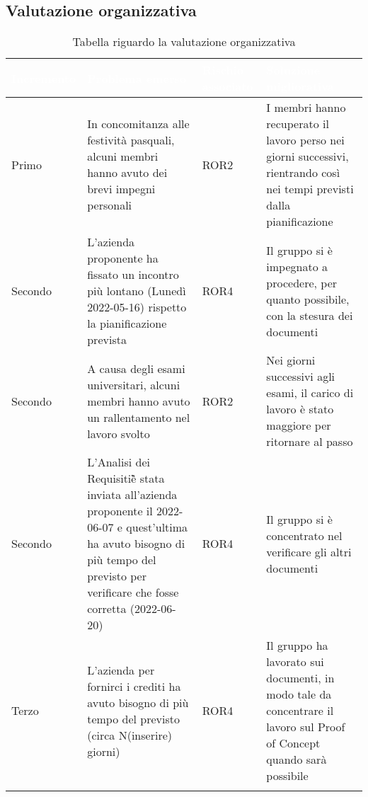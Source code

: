 \subsection{Valutazione organizzativa}
{
    \setlength{\freewidth}{\dimexpr\textwidth-10\tabcolsep}
    \renewcommand{\arraystretch}{1.5}
    \centering
    \setlength{\aboverulesep}{0pt}
    \setlength{\belowrulesep}{0pt}
    \begin{longtable}{C{.16\freewidth} C{.38\freewidth} C{.14\freewidth} C{.38\freewidth}}
       \toprule
    \textcolor{white}{\textbf{Incremento}}&
    \textcolor{white}{\textbf{Problema emerso}}&
    \textcolor{white}{\textbf{Rischio associato}}&
    \textcolor{white}{\textbf{Soluzione migliorativa}}\\	
    \toprule
    \endhead
    
   Primo & In concomitanza alle festività pasquali, alcuni membri hanno avuto dei brevi impegni personali & 
          ROR2 &I membri hanno recuperato il lavoro perso nei giorni successivi, rientrando così nei tempi previsti dalla pianificazione \\
   Secondo & L'azienda proponente ha fissato un incontro più lontano (Lunedì 2022-05-16) rispetto la pianificazione prevista &
            ROR4 & Il gruppo si è impegnato a procedere, per quanto possibile, con la stesura dei documenti \\
   Secondo & A causa degli esami universitari, alcuni membri hanno avuto un rallentamento nel lavoro svolto & 
           ROR2 & Nei giorni successivi agli esami, il carico di lavoro è stato maggiore per ritornare al passo \\
   Secondo & L'Analisi dei Requisiti\G è stata inviata all'azienda proponente il 2022-06-07 e quest'ultima ha avuto bisogno di più tempo del previsto per verificare che fosse corretta (2022-06-20) & ROR4 &
            Il gruppo si è concentrato nel verificare gli altri documenti \\
   Terzo & L'azienda per fornirci i crediti ha avuto bisogno di più tempo del previsto (circa N(inserire) giorni) & ROR4 & Il gruppo ha lavorato sui documenti, in modo tale da concentrare il lavoro sul Proof of Concept quando sarà possibile \\
   \bottomrule
   \caption{Tabella riguardo la valutazione organizzativa}
   \end{longtable}
}

\newpage
